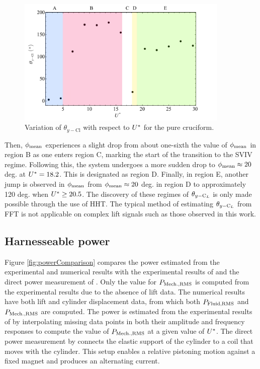 \documentclass[oneside]{utmthesis}
\begin{document}
\begin{figure}[H]
  \centering
  \hspace{1cm} \includegraphics[width=0.9\textwidth]{figs/phaseAngleRegime}
  \caption{Variation of $\theta_{y-\text{Cl}}$ with respect to $U^{*}$ for the pure cruciform.}
  \label{fig:phaseAngleRegime}
\end{figure}

Then, $\phi_{\text{mean}}$ experiences a slight drop from about one-sixth the value of $\phi_{\text{mean}}$ in region B as one enters region C, marking the start of the transition to the SVIV regime. Following this, the system undergoes a more sudden drop to $\phi_{\text{mean}} \approx 20$ deg. at $U^{*} = 18.2$. This is designated as region D. Finally, in region E, another jump is observed in $\phi_{\text{mean}}$ from $\phi_{\text{mean}} \approx 20$ deg. in region D to approximately 120 deg. when $U^{*} \geq 20.5$. The discovery of these regimes of $\theta_{y-\text{C}_{L}}$ is only made possible through the use of HHT. The typical method of estimating $\theta_{y-\text{C}_{L}}$ from FFT is not applicable on complex lift signals such as those observed in this work.

\subsection{Harnesseable power} \label{ssec:mathModel}

Figure \ref{fig:powerComparison} compares the power estimated from the experimental and numerical results with the experimental results of \citet{Nguyen2012} and the direct power measurement of \citet{Koide2013}. Only the value for $P_{\text{Mech.,RMS}}$ is computed from the experimental results due to the absence of lift data. The numerical results have both lift and cylinder displacement data, from which both $P_{\text{Fluid,RMS}}$ and $P_{\text{Mech.,RMS}}$ are computed. The power is estimated from the experimental results of \citet{Nguyen2012} by interpolating missing data points in both their amplitude and frequency responses to compute the value of $P_{\text{Mech.,RMS}}$ at a given value of $U^{*}$. The direct power measurement by \citet{Koide2013} connects the elastic support of the cylinder to a coil that moves with the cylinder. This setup enables a relative pistoning motion against a fixed magnet and produces an alternating current.
\end{document}
